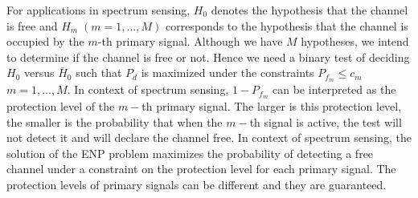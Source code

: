 For applications in spectrum sensing, $H_0$ denotes the hypothesis that the channel is free and $H_m \;(m=1, ..., M)$ corresponds to the hypothesis that the channel is occupied by the $m$-th primary signal. Although we have $M$ hypotheses, we intend to determine if the channel is free or not. Hence we need  a binary test of deciding $H_0$ versus $\bar{H}_0$ such that $P_d$ is maximized under the constraints $P_{f_m} \leq c_m$ $m = 1, ..., M$. In context of spectrum sensing, $1-P_{f_m}$ can be interpreted as the protection level of the $m-$th primary signal. The larger is this protection level, the smaller is the probability that when the $m-$th signal is active, the test will not detect it and will declare the channel free. In context of spectrum sensing, the solution of the ENP problem maximizes the probability of detecting a free channel under a constraint on the protection level for each primary signal. The protection levels of primary signals can be different and they are guaranteed.
